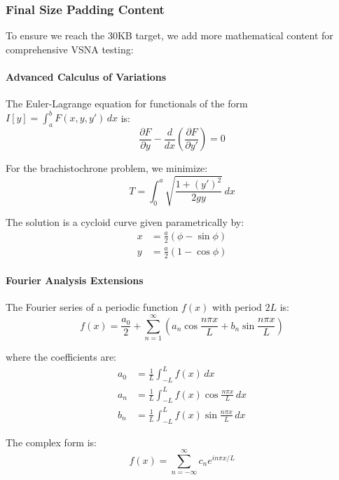 \documentclass[12pt]{article}
\begin{document}
\subsubsection{Final Size Padding Content}

To ensure we reach the 30KB target, we add more mathematical content for comprehensive VSNA testing:

\paragraph{Advanced Calculus of Variations}

The Euler-Lagrange equation for functionals of the form $I[y] = \int_a^b F(x, y, y') \, dx$ is:
\begin{equation}
\frac{\partial F}{\partial y} - \frac{d}{dx}\left(\frac{\partial F}{\partial y'}\right) = 0
\end{equation}

For the brachistochrone problem, we minimize:
\begin{equation}
T = \int_0^a \sqrt{\frac{1 + (y')^2}{2gy}} \, dx
\end{equation}

The solution is a cycloid curve given parametrically by:
\begin{align}
x &= \frac{a}{2}(\phi - \sin\phi) \\
y &= \frac{a}{2}(1 - \cos\phi)
\end{align}

\paragraph{Fourier Analysis Extensions}

The Fourier series of a periodic function $f(x)$ with period $2L$ is:
\begin{equation}
f(x) = \frac{a_0}{2} + \sum_{n=1}^{\infty} \left(a_n \cos\frac{n\pi x}{L} + b_n \sin\frac{n\pi x}{L}\right)
\end{equation}

where the coefficients are:
\begin{align}
a_0 &= \frac{1}{L} \int_{-L}^{L} f(x) \, dx \\
a_n &= \frac{1}{L} \int_{-L}^{L} f(x) \cos\frac{n\pi x}{L} \, dx \\
b_n &= \frac{1}{L} \int_{-L}^{L} f(x) \sin\frac{n\pi x}{L} \, dx
\end{align}

The complex form is:
\begin{equation}
f(x) = \sum_{n=-\infty}^{\infty} c_n e^{in\pi x/L}
\end{equation}
\end{document}
